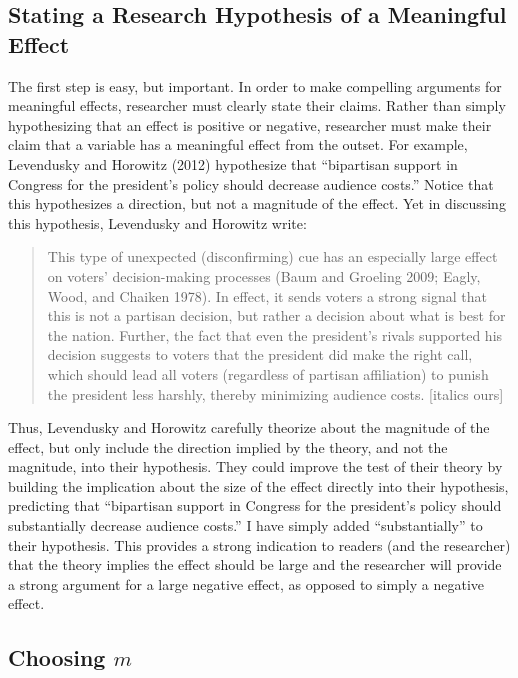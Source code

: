 \documentclass[12pt]{article}
\begin{document}
\doublespace

\subsection*{Stating a Research Hypothesis of a Meaningful Effect}

The first step is easy, but important. In order to make compelling arguments for meaningful effects, researcher must clearly state their claims. Rather than simply hypothesizing that an effect is positive or negative, researcher must make their claim that a variable has a meaningful effect from the outset. For example, Levendusky and Horowitz (2012) hypothesize that ``bipartisan support in Congress for the president's policy should decrease audience costs.'' Notice that this hypothesizes a direction, but not a magnitude of the effect. Yet in discussing this hypothesis, Levendusky and Horowitz write: 

\begin{quote}
This type of unexpected (disconfirming) cue has an especially large effect on voters' decision-making processes (Baum and Groeling 2009; Eagly, Wood, and Chaiken 1978). In effect, it sends voters a strong signal that this is not a partisan decision, but rather a decision about what is best for the nation. Further, the fact that even the president's rivals supported his decision suggests to voters that the president did make the right call, which should lead all voters (regardless of partisan affiliation) to punish the president less harshly, thereby minimizing audience costs. [italics ours]
\end{quote}

Thus, Levendusky and Horowitz carefully theorize about the magnitude of the effect, but only include the direction implied by the theory, and not the magnitude, into their hypothesis. They could improve the test of their theory by building the implication about the size of the effect directly into their hypothesis, predicting that ``bipartisan support in Congress for the president's policy should substantially decrease audience costs.'' I have simply added ``substantially'' to their hypothesis. This provides a strong indication to readers (and the researcher) that the theory implies the effect should be large and the researcher will provide a strong argument for a large negative effect, as opposed to simply a negative effect. 


\subsection*{Choosing $m$}
\end{document}
